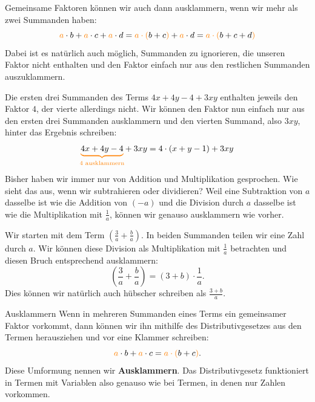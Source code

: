 \documentclass[../../main.tex]{subfiles}
\begin{document}
	Gemeinsame Faktoren können wir auch dann ausklammern, wenn wir mehr als zwei Summanden haben:
	\[{\color{orange}a}\cdot b + {\color{orange}a}\cdot c + {\color{orange}a}\cdot d = {\color{orange}a\cdot (}b+c{\color{orange})} + {\color{orange}a}\cdot d = {\color{orange}a\cdot (}b+c+d{\color{orange})}\]
	Dabei ist es natürlich auch möglich, Summanden zu ignorieren, die unseren Faktor nicht enthalten und den Faktor einfach nur aus den restlichen Summanden auszuklammern.
	\begin{example}{}
		Die ersten drei Summanden des Terms $4x+4y-4+3xy$ enthalten jeweils den Faktor $4$, der vierte allerdings nicht. Wir können den Faktor nun einfach nur aus den ersten drei Summanden ausklammern und den vierten Summand, also $3xy$, hinter das Ergebnis schreiben:
		\[\colorbrace{4x+4y-4}{4\text{ ausklammern}}+3xy=4\cdot (x+y-1)+3xy\]
	\end{example}

	Bisher haben wir immer nur von Addition und Multiplikation gesprochen. Wie sieht das aus, wenn wir subtrahieren oder dividieren?
	Weil eine Subtraktion von $a$ dasselbe ist wie die Addition von $(-a)$ und die Division durch $a$ dasselbe ist wie die Multiplikation mit $\frac{1}{a}$, können wir genauso ausklammern wie vorher.
	\begin{example}{}
		Wir starten mit dem Term $\left(\frac{3}{a}+\frac{b}{a}\right)$. In beiden Summanden teilen wir eine Zahl durch $a$. Wir können diese Division als Multiplikation mit $\frac{1}{a}$ betrachten und diesen Bruch entsprechend ausklammern:
		\[\left(\frac{3}{a}+\frac{b}{a}\right)=(3+b)\cdot \frac{1}{a}.\] 
		Dies können wir natürlich auch hübscher schreiben als $\frac{3+b}{a}$.
	\end{example}


	\begin{nutshell}{Ausklammern}
		Wenn in mehreren Summanden eines Terms ein gemeinsamer Faktor vorkommt, dann können wir ihn mithilfe des Distributivgesetzes aus den Termen herausziehen und vor eine Klammer schreiben:
		\[{\color{orange}a}\cdot b + {\color{orange}a}\cdot c = {\color{orange}a\cdot (}b+c{\color{orange})}.\]
		Diese Umformung nennen wir \textbf{Ausklammern}. Das Distributivgesetz funktioniert in Termen mit Variablen also genauso wie bei Termen, in denen nur Zahlen vorkommen.
	\end{nutshell}
\end{document}
